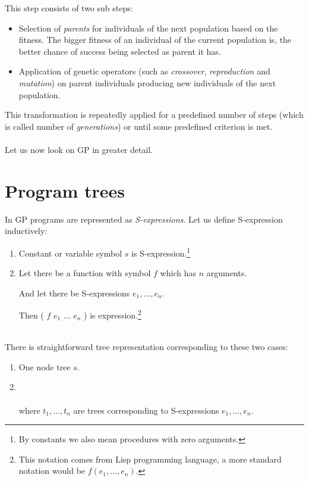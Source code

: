 \documentclass[12pt,a4paper]{report}
\newcommand{\Lets}{Let us\xspace}
\begin{document}
This step consists of two sub steps:
\begin{itemize} 
	\item Selection of \textit{parents} for individuals of the next population based on the fitness.
	      The bigger fitness of an individual of the current population is, 
	      the better chance of success being selected as parent it has.  
	\item Application of genetic operators (such as \textit{crossover}, 
	      \textit{reproduction} and \textit{mutation}) 
		  on parent individuals producing new individuals of the next population.  
\end{itemize}	  
This transformation is repeatedly applied for a predefined number of steps (which is called 
number of \textit{generations}) or until some predefined criterion is met.	
\\\\
\Lets now look on GP in greater detail. 

\newpage
\section{Program trees}
\label{GP-prog-trees}

In GP programs are represented as \textit{S-expressions}. 
\Lets define S-expression inductively:

\begin{samepage}
\begin{enumerate}
	\item Constant or variable symbol $s$ is S-expression.\footnote{
	      By constants we also mean procedures with zero arguments.}
	\item Let there be a function with symbol $f$ which has $n$ arguments.
	 
	      And let there be S-expressions $e_{1}, ..., e_{n}$. 
	      
	      Then ( $f$ $e_{1}$ ... $e_{n}$ ) is expression.\footnote{
	      This notation comes from Lisp programming language, 
	      a more standard notation would be $f(e_{1}, ... ,e_{n})$.}   
\end{enumerate}
\end{samepage}~\\
There is straightforward tree representation corresponding to these two cases:

\begin{enumerate}
	\item One node tree $s$.
    \item \mbox{}\\\\
		 where $t_{1}, ..., t_{n}$ are trees corresponding 
		 to S-expressions $e_{1}, ..., e_{n}$.	   
\end{enumerate}
\end{document}
